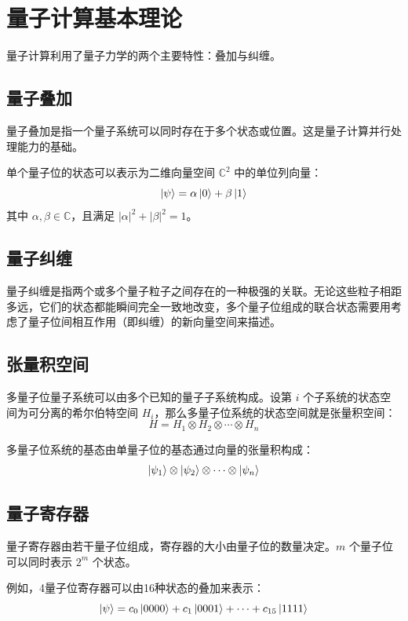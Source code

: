 \section{量子计算基本理论}
量子计算利用了量子力学的两个主要特性：叠加与纠缠。

\subsection{量子叠加}
量子叠加是指一个量子系统可以同时存在于多个状态或位置。这是量子计算并行处理能力的基础。

单个量子位的状态可以表示为二维向量空间 $\mathbb{C}^2$ 中的单位列向量：
\[
\ket{\psi} = \alpha\ket{0} + \beta\ket{1}
\]
其中 $\alpha,\beta \in \mathbb{C}$，且满足 $|\alpha|^2 + |\beta|^2 = 1$。

\subsection{量子纠缠}
量子纠缠是指两个或多个量子粒子之间存在的一种极强的关联。无论这些粒子相距多远，它们的状态都能瞬间完全一致地改变，多个量子位组成的联合状态需要用考虑了量子位间相互作用（即纠缠）的新向量空间来描述。

\subsection{张量积空间}
多量子位量子系统可以由多个已知的量子子系统构成。设第 $i$ 个子系统的状态空间为可分离的希尔伯特空间 $H_i$，那么多量子位系统的状态空间就是张量积空间：
\[
H = H_1 \otimes H_2 \otimes \cdots \otimes H_n
\]

多量子位系统的基态由单量子位的基态通过向量的张量积构成：
\[
\ket{\psi_1} \otimes \ket{\psi_2} \otimes \cdots \otimes \ket{\psi_n}
\]

\subsection{量子寄存器}
量子寄存器由若干量子位组成，寄存器的大小由量子位的数量决定。$m$ 个量子位可以同时表示 $2^m$ 个状态。

例如，4量子位寄存器可以由16种状态的叠加来表示：
\[
\ket{\psi} = c_0\ket{0000} + c_1\ket{0001} + \cdots + c_{15}\ket{1111}
\]
